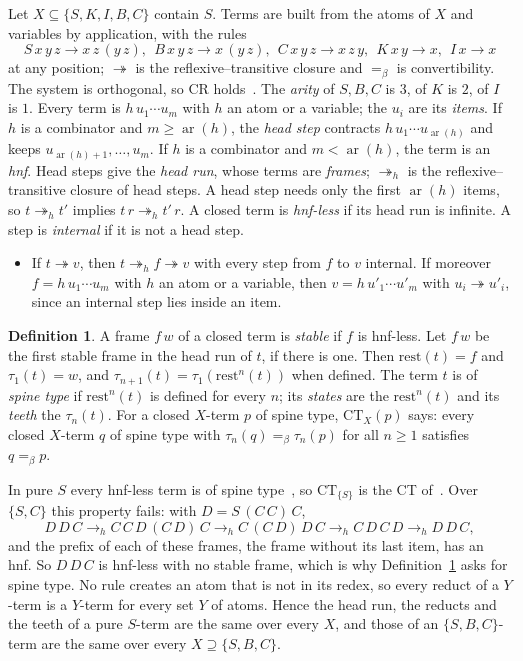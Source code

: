 \documentclass[11pt]{amsart}
\theoremstyle{definition}
\newtheorem{definition}[theorem]{Definition}
\newcommand{\red}{\twoheadrightarrow}
\newcommand{\hred}{\twoheadrightarrow_h}
\newcommand{\hstep}{\to_h}
\newcommand{\conv}{=_\beta}
\newcommand{\rest}{\mathrm{rest}}
\newcommand{\CT}{\mathrm{CT}}
\begin{document}
Let $X\subseteq\{S,K,I,B,C\}$ contain $S$. Terms are built from the atoms of $X$ and variables by
application, with the rules
\[
S\,x\,y\,z\to x\,z\,(y\,z),\ \ B\,x\,y\,z\to x\,(y\,z),\ \ C\,x\,y\,z\to x\,z\,y,\ \
K\,x\,y\to x,\ \ I\,x\to x
\]
at any position; $\red$ is the reflexive--transitive closure and $\conv$ is convertibility. The system
is orthogonal, so CR holds~\citep{terese}. The \emph{arity} of $S,B,C$ is $3$, of $K$ is $2$, of $I$ is
$1$. Every term is $h\,u_1\cdots u_m$ with $h$ an atom or a variable; the $u_i$ are its \emph{items}. If
$h$ is a combinator and $m\ge\operatorname{ar}(h)$, the \emph{head step} contracts
$h\,u_1\cdots u_{\operatorname{ar}(h)}$ and keeps $u_{\operatorname{ar}(h)+1},\dots,u_m$. If $h$ is a
combinator and $m<\operatorname{ar}(h)$, the term is an \emph{hnf}. Head steps give the \emph{head run},
whose terms are \emph{frames}; $\hred$ is the reflexive--transitive closure of head steps. A head step
needs only the first $\operatorname{ar}(h)$ items, so $t\hred t'$ implies $t\,r\hred t'\,r$. A closed
term is \emph{hnf-less} if its head run is infinite. A step is \emph{internal} if it is not a head step.

\begin{itemize}
\item[(Std)] \citep{terese,hindley78} If $t\red v$, then $t\hred f\red v$ with every step from $f$ to
$v$ internal. If moreover $f=h\,u_1\cdots u_m$ with $h$ an atom or a variable, then
$v=h\,u'_1\cdots u'_m$ with $u_i\red u'_i$, since an internal step lies inside an item.
\end{itemize}

\begin{definition}\label{def:CT}
A frame $f\,w$ of a closed term is \emph{stable} if $f$ is hnf-less. Let $f\,w$ be the first stable
frame in the head run of $t$, if there is one. Then $\rest(t)=f$ and $\tau_1(t)=w$, and
$\tau_{n+1}(t)=\tau_1(\rest^n(t))$ when defined. The term $t$ is of \emph{spine type} if $\rest^n(t)$ is
defined for every $n$; its \emph{states} are the $\rest^n(t)$ and its \emph{teeth} the $\tau_n(t)$. For a
closed $X$-term $p$ of spine type, $\CT_X(p)$ says: every closed $X$-term $q$ of spine type with
$\tau_n(q)\conv\tau_n(p)$ for all $n\ge1$ satisfies $q\conv p$.
\end{definition}

In pure $S$ every hnf-less term is of spine type~\citep[(F2)]{s11}, so $\CT_{\{S\}}$ is the CT
of~\citep{s11,s15}. Over $\{S,C\}$ this property fails: with $D=S\,(C\,C)\,C$,
\[
D\,D\,C\hstep C\,C\,D\,(C\,D)\,C\hstep C\,(C\,D)\,D\,C\hstep C\,D\,C\,D\hstep D\,D\,C,
\]
and the prefix of each of these frames, the frame without its last item, has an hnf. So $D\,D\,C$ is
hnf-less with no stable frame, which is why Definition~\ref{def:CT} asks for spine type. No rule creates
an atom that is not in its redex, so every reduct of a $Y$-term is a $Y$-term for every set $Y$ of
atoms. Hence the head run, the reducts and the teeth of a pure $S$-term are the same over every $X$, and
those of an $\{S,B,C\}$-term are the same over every $X\supseteq\{S,B,C\}$.
\end{document}
